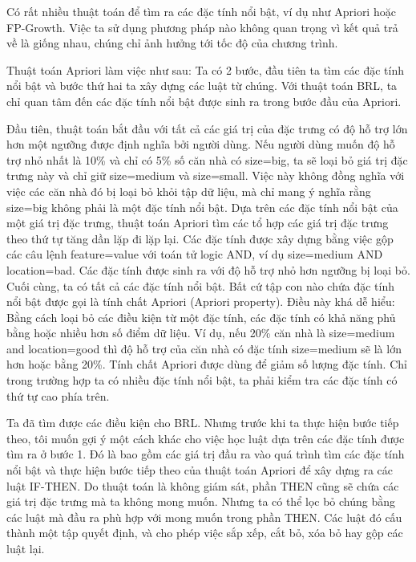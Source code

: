 Có rất nhiều thuật toán để tìm ra các đặc tính nổi bật, ví dụ như Apriori hoặc FP-Growth. Việc ta sử dụng phương pháp nào không quan trọng vì kết quả trả về là giống nhau, chúng chỉ ảnh hưởng tới tốc độ của chương trình.

Thuật toán Apriori làm việc như sau: Ta có 2 bước, đầu tiên ta tìm các đặc tính nổi bật và bước thứ hai ta xây dựng các luật từ chúng. Với thuật toán BRL, ta chỉ quan tâm đến các đặc tính nổi bật được sinh ra trong bước đầu của Apriori.

Đầu tiên, thuật toán bắt đầu với tất cả các giá trị của đặc trưng có độ hỗ trợ lớn hơn một ngưỡng được định nghĩa bởi người dùng. Nếu người dùng muốn độ hỗ trợ nhỏ nhất là 10\% và chỉ có 5\% số căn nhà có size=big, ta sẽ loại bỏ giá trị đặc trưng này và chỉ giữ size=medium và size=small. Việc này không đồng nghĩa với việc các căn nhà đó bị loại bỏ khỏi tập dữ liệu, mà chỉ mang ý nghĩa rằng size=big không phải là một đặc tính nổi bật. Dựa trên các đặc tính nổi bật của một giá trị đặc trưng, thuật toán Apriori tìm các tổ hợp các giá trị đặc trưng theo thứ tự tăng dần lặp đi lặp lại. Các đặc tính được xây dựng bằng việc gộp các câu lệnh feature=value với toán tử logic AND, ví dụ size=medium AND location=bad. Các đặc tính được sinh ra với độ hỗ trợ nhỏ hơn ngưỡng bị loại bỏ. Cuối cùng, ta có tất cả các đặc tính nổi bật. Bất cứ tập con nào chứa đặc tính nổi bật được gọi là tính chất Apriori (Apriori property). Điều này khá dễ hiểu: Bằng cách loại bỏ các điều kiện từ một đặc tính, các đặc tính có khả năng phủ bằng hoặc nhiều hơn số điểm dữ liệu. Ví dụ, nếu 20\% căn nhà là size=medium and location=good thì độ hỗ trợ của căn nhà có đặc tính size=medium sẽ là lớn hơn hoặc bằng 20\%. Tính chất Apriori được dùng để giảm số lượng đặc tính. Chỉ trong trường hợp ta có nhiều đặc tính nổi bật, ta phải kiểm tra các đặc tính có thứ tự cao phía trên.

Ta đã tìm được các điều kiện cho BRL. Nhưng trước khi ta thực hiện bước tiếp theo, tôi muốn gợi ý một cách khác cho việc học luật dựa trên các đặc tính được tìm ra ở bước 1. Đó là bao gồm các giá trị đầu ra vào quá trình tìm các đặc tính nổi bật và thực hiện bước tiếp theo của thuật toán Apriori để xây dựng ra các luật IF-THEN. Do thuật toán là không giám sát, phần THEN cũng sẽ chứa các giá trị đặc trưng mà ta không mong muốn. Nhưng ta có thể lọc bỏ chúng bằng các luật mà đầu ra phù hợp với mong muốn trong phần THEN. Các luật đó cấu thành một tập quyết định, và cho phép việc sắp xếp, cắt bỏ, xóa bỏ hay gộp các luật lại.

